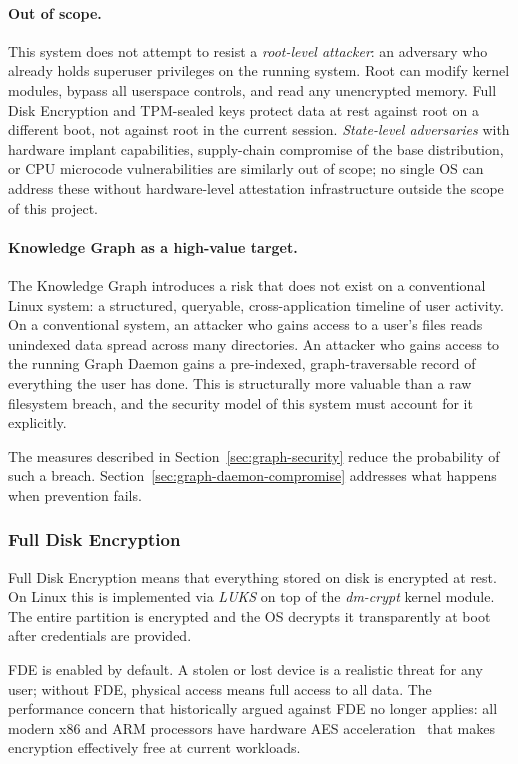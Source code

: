 \paragraph{Out of scope.}
This system does not attempt to resist a \emph{root-level attacker}: an
adversary who already holds superuser privileges on the running system. Root
can modify kernel modules, bypass all userspace controls, and read any
unencrypted memory. Full Disk Encryption and TPM-sealed keys protect data at
rest against root on a different boot, not against root in the current session.
\emph{State-level adversaries} with hardware implant capabilities, supply-chain
compromise of the base distribution, or CPU microcode vulnerabilities are
similarly out of scope; no single OS can address these without hardware-level
attestation infrastructure outside the scope of this project.

\paragraph{Knowledge Graph as a high-value target.}
The Knowledge Graph introduces a risk that does not exist on a conventional
Linux system: a structured, queryable, cross-application timeline of user
activity. On a conventional system, an attacker who gains access to a user's
files reads unindexed data spread across many directories. An attacker who
gains access to the running Graph Daemon gains a pre-indexed, graph-traversable
record of everything the user has done. This is structurally more valuable than
a raw filesystem breach, and the security model of this system must account for
it explicitly.

The measures described in Section~\ref{sec:graph-security} reduce the
probability of such a breach. Section~\ref{sec:graph-daemon-compromise}
addresses what happens when prevention fails.

\subsubsection{Full Disk Encryption}
\label{sec:fde}

Full Disk Encryption means that everything stored on disk is encrypted at
rest. On Linux this is implemented via \emph{LUKS} on top of the
\emph{dm-crypt} kernel module. The entire partition is encrypted and the OS
decrypts it transparently at boot after credentials are provided.

FDE is enabled by default. A stolen or lost device is a realistic threat for
any user; without FDE, physical access means full access to all data. The
performance concern that historically argued against FDE no longer applies:
all modern x86 and ARM processors have hardware AES acceleration~\cite{intel:aes}
that makes encryption effectively free at current workloads.

